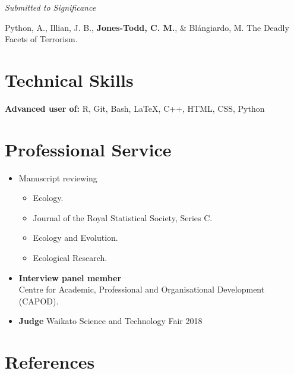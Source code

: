 \documentclass[10pt,a4paper]{moderncv}
\begin{document}
\vspace{5pt}

\textit{\small{Submitted to Significance}}\\

\vspace{-3pt}

Python, A.,  Illian, J. B., \textbf{Jones-Todd, C. M.}, \& Bl\'{a}ngiardo, M. The Deadly Facets of Terrorism.\\

\vspace{5pt}

\section{Technical Skills}

\vspace{6pt}
    \textbf{Advanced user of:} R, Git, Bash, \LaTeX, C++, HTML, CSS, Python


\section{Professional Service}

\vspace{6pt}

\begin{itemize}
\item Manuscript reviewing
  \begin{itemize}
  \item Ecology.
  \item Journal of the Royal Statistical Society, Series C.
  \item  Ecology and Evolution.
  \item  Ecological Research.
  \end{itemize}
  \item \textbf{Interview panel member}\\
    Centre for Academic, Professional and Organisational Development (CAPOD).
    
  \item \textbf{Judge} Waikato Science and Technology Fair 2018
  \end{itemize}

\newpage
\section{References}
\end{document}
